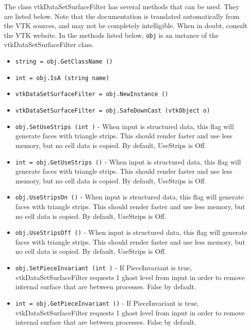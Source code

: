 The class vtkDataSetSurfaceFilter has several methods that can be used.
  They are listed below.
Note that the documentation is translated automatically from the VTK sources,
and may not be completely intelligible.  When in doubt, consult the VTK website.
In the methods listed below, \verb|obj| is an instance of the vtkDataSetSurfaceFilter class.
\begin{itemize}
\item  \verb|string = obj.GetClassName ()|

\item  \verb|int = obj.IsA (string name)|

\item  \verb|vtkDataSetSurfaceFilter = obj.NewInstance ()|

\item  \verb|vtkDataSetSurfaceFilter = obj.SafeDownCast (vtkObject o)|

\item  \verb|obj.SetUseStrips (int )| -  When input is structured data, this flag will generate faces with
 triangle strips.  This should render faster and use less memory, but no
 cell data is copied.  By default, UseStrips is Off.

\item  \verb|int = obj.GetUseStrips ()| -  When input is structured data, this flag will generate faces with
 triangle strips.  This should render faster and use less memory, but no
 cell data is copied.  By default, UseStrips is Off.

\item  \verb|obj.UseStripsOn ()| -  When input is structured data, this flag will generate faces with
 triangle strips.  This should render faster and use less memory, but no
 cell data is copied.  By default, UseStrips is Off.

\item  \verb|obj.UseStripsOff ()| -  When input is structured data, this flag will generate faces with
 triangle strips.  This should render faster and use less memory, but no
 cell data is copied.  By default, UseStrips is Off.

\item  \verb|obj.SetPieceInvariant (int )| -  If PieceInvariant is true, vtkDataSetSurfaceFilter requests
 1 ghost level from input in order to remove internal surface
 that are between processes. False by default.

\item  \verb|int = obj.GetPieceInvariant ()| -  If PieceInvariant is true, vtkDataSetSurfaceFilter requests
 1 ghost level from input in order to remove internal surface
 that are between processes. False by default.


\end{itemize}
